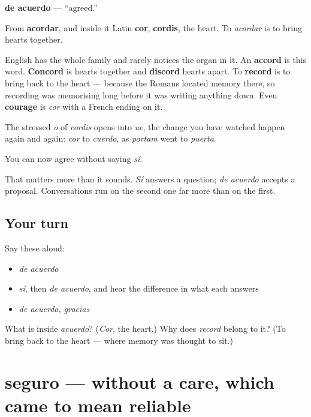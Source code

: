 \begin{cousinweb}
\textbf{de acuerdo} — \textquotedblleft{}agreed.\textquotedblright{}

From \textbf{acordar}, and inside it Latin \textbf{cor}, \textbf{cordis}, the heart. To \emph{acordar} is to bring hearts together.

English has the whole family and rarely notices the organ in it. An \textbf{accord} is this word. \textbf{Concord} is hearts together and \textbf{discord} hearts apart. To \textbf{record} is to bring back to the heart — because the Romans located memory there, so recording was memorising long before it was writing anything down. Even \textbf{courage} is \emph{cor} with a French ending on it.

The stressed \emph{o} of \emph{cordis} opens into \emph{ue}, the change you have watched happen again and again: \emph{cor} to \emph{cuerdo}, as \emph{portam} went to \emph{puerta}.
\end{cousinweb}

\begin{grammarlens}[title={What you've built}]
You can now agree without saying \emph{sí}.

That matters more than it sounds. \emph{Sí} answers a question; \emph{de acuerdo} accepts a proposal. Conversations run on the second one far more than on the first.
\end{grammarlens}

\subsection*{Your turn}
Say these aloud:

\begin{itemize}
\raggedright
  \item \emph{de acuerdo}
  \item \emph{sí}, then \emph{de acuerdo}, and hear the difference in what each answers
  \item \emph{de acuerdo, gracias}
\end{itemize}

\begin{tcolorbox}[breakable,colback=teal!4,colframe=teal!35!black,title={Before you move on}]
What is inside \emph{acuerdo}? (\emph{Cor}, the heart.) Why does \emph{record} belong to it? (To bring back to the heart — where memory was thought to sit.)
\end{tcolorbox}
\section[seguro]{seguro — without a care, which came to mean reliable}

